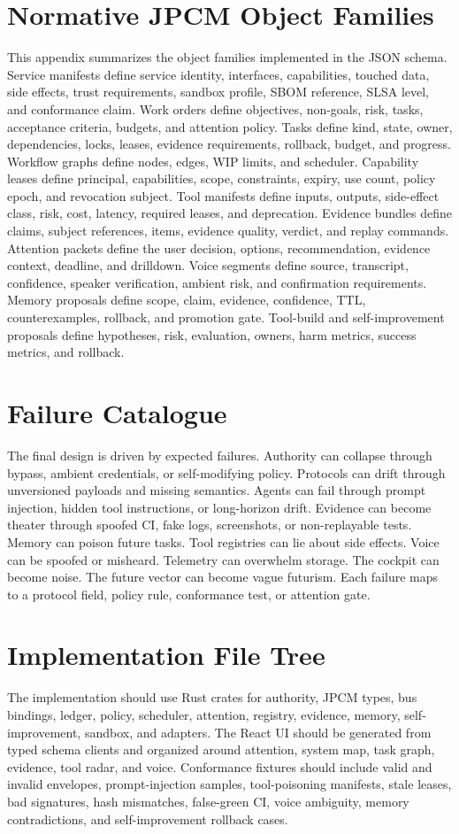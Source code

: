 \documentclass[journal,onecolumn]{IEEEtran}
\begin{document}
\section{Normative JPCM Object Families}
This appendix summarizes the object families implemented in the JSON schema. Service manifests define service identity, interfaces, capabilities, touched data, side effects, trust requirements, sandbox profile, SBOM reference, SLSA level, and conformance claim. Work orders define objectives, non-goals, risk, tasks, acceptance criteria, budgets, and attention policy. Tasks define kind, state, owner, dependencies, locks, leases, evidence requirements, rollback, budget, and progress. Workflow graphs define nodes, edges, WIP limits, and scheduler. Capability leases define principal, capabilities, scope, constraints, expiry, use count, policy epoch, and revocation subject. Tool manifests define inputs, outputs, side-effect class, risk, cost, latency, required leases, and deprecation. Evidence bundles define claims, subject references, items, evidence quality, verdict, and replay commands. Attention packets define the user decision, options, recommendation, evidence context, deadline, and drilldown. Voice segments define source, transcript, confidence, speaker verification, ambient risk, and confirmation requirements. Memory proposals define scope, claim, evidence, confidence, TTL, counterexamples, rollback, and promotion gate. Tool-build and self-improvement proposals define hypotheses, risk, evaluation, owners, harm metrics, success metrics, and rollback.

\section{Failure Catalogue}
The final design is driven by expected failures. Authority can collapse through bypass, ambient credentials, or self-modifying policy. Protocols can drift through unversioned payloads and missing semantics. Agents can fail through prompt injection, hidden tool instructions, or long-horizon drift. Evidence can become theater through spoofed CI, fake logs, screenshots, or non-replayable tests. Memory can poison future tasks. Tool registries can lie about side effects. Voice can be spoofed or misheard. Telemetry can overwhelm storage. The cockpit can become noise. The future vector can become vague futurism. Each failure maps to a protocol field, policy rule, conformance test, or attention gate.

\section{Implementation File Tree}
The implementation should use Rust crates for authority, JPCM types, bus bindings, ledger, policy, scheduler, attention, registry, evidence, memory, self-improvement, sandbox, and adapters. The React UI should be generated from typed schema clients and organized around attention, system map, task graph, evidence, tool radar, and voice. Conformance fixtures should include valid and invalid envelopes, prompt-injection samples, tool-poisoning manifests, stale leases, bad signatures, hash mismatches, false-green CI, voice ambiguity, memory contradictions, and self-improvement rollback cases.
\end{document}

